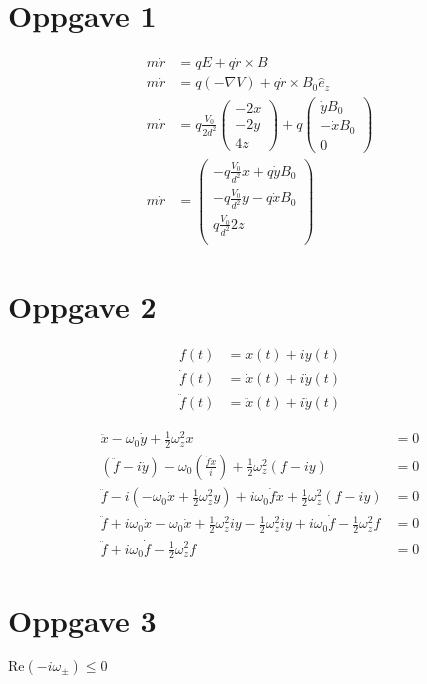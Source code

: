 \documentclass[english]{article}
\begin{document}
\section*{Oppgave 1}
\begin{align}
m \dot r &= qE + q\dot r \times B \\
m \dot r &= q(- \nabla V) + q\dot r \times B_0 \hat{e}_z \\
m \dot r &= q \frac{V_0}{2d^2} \begin{pmatrix} -2x \\ -2y \\ 4z \end{pmatrix}
          + q \begin{pmatrix} \dot y B_0 \\ -\dot x B_0 \\ 0 \end{pmatrix} \\
m \dot r &=
    \begin{pmatrix} 
        - q \frac{V_0}{d^2} x + q \dot y B_0 \\
        - q \frac{V_0}{d^2} y - q \dot x B_0 \\
        q \frac{V_0}{d^2} 2z \\
    \end{pmatrix}
\end{align}

\section*{Oppgave 2}
\begin{align}
f(t) &= x(t) + iy(t) \\
\dot f(t) &= \dot x(t) + i \dot y(t) \\
\ddot f(t) &= \ddot x(t) + i \ddot y(t)
\end{align}

\begin{align}
\ddot x - \omega_0 \dot y + \frac{1}{2} \omega_z^2 x &= 0 \\
\left( \ddot f - i \ddot y \right) - \omega_0 \left( \frac{\dot f \dot x}{i} \right) + \frac{1}{2} \omega_z^2 \left( f - iy \right) &= 0 \\
\ddot f - i \left( - \omega_0 \dot x + \frac{1}{2} \omega_z^2 y \right) + i \omega_0 \dot f \dot x + \frac{1}{2} \omega_z^2 \left( f - iy \right) &= 0 \\
\ddot f + i \omega_0 \dot x - \omega_0 \dot x + \frac{1}{2} \omega_z^2 i y - \frac{1}{2} \omega_z^2 i y + i \omega_0 \dot f - \frac{1}{2} \omega_z^2 f &= 0 \\
\ddot f + i \omega_0 \dot f - \frac{1}{2} \omega_z^2 f &= 0
\end{align}

\section*{Oppgave 3}
$\text{Re}(-i\omega_\pm) \leq 0$
\end{document}
